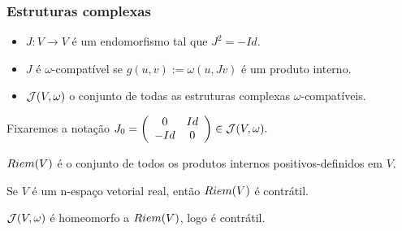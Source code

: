\documentclass{beamer}
\begin{document}
	\begin{frame}
		\frametitle{Estruturas complexas}
		
		\begin{definicao}
			\begin{itemize}
				\item $J: V \to V$ é um endomorfismo tal que $J^{2} = -Id$. 
				
				\item $J$ é $\omega$-compatível se $g(u,v):=\omega(u, Jv)$ é um produto interno. 
				
				\item $\mathcal{J}(V, \omega)$ o conjunto de todas as estruturas complexas $\omega$-compatíveis.
				
			\end{itemize}
		\end{definicao}
		Fixaremos a notação
			$
			J_{0}=
			\left(
			\begin{array}{cc}
			0 & Id
			\\
			-Id & 0
			\end{array}
			\right) \in \mathcal{J}(V, \omega) .
			$
	\end{frame}
	
	\begin{frame}
		
		\begin{definicao}
			$Riem(V)$ é o conjunto de todos os produtos internos positivos-definidos em $V$.
		\end{definicao}
		
		
		\begin{proposicao}
			Se $V$ é um n-espaço vetorial real, então $Riem(V)$ é contrátil.
		\end{proposicao}
		
		\begin{proposicao}
			$\mathcal{J}(V, \omega)$ é homeomorfo a $Riem(V)$, logo é contrátil.
		\end{proposicao}
	\end{frame}
	
\end{document}
